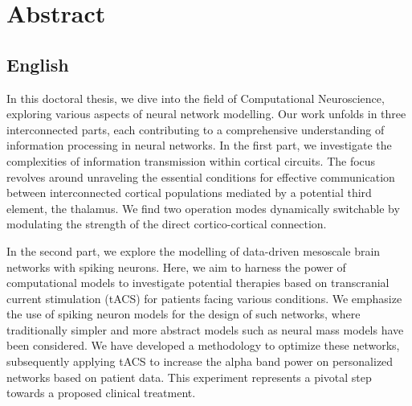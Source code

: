 \documentclass[../main.tex]{subfiles}
\begin{document}
\begingroup
\let\cleardoublepage\relax
\let\cleardoublepage\relax

\chapter*{Abstract}
\section*{English}
In this doctoral thesis, we dive into the field of Computational Neuroscience, exploring various aspects of neural network modelling.
Our work unfolds in three interconnected parts, each contributing to a comprehensive understanding of information processing in neural networks.
In the first part, we investigate the complexities of information transmission within cortical circuits.
The focus revolves around unraveling the essential conditions for effective communication between interconnected cortical populations mediated by a potential third element, the thalamus.
We find two operation modes dynamically switchable by modulating the strength of the direct cortico-cortical connection.

In the second part, we explore the modelling of data-driven mesoscale brain networks with spiking neurons.
Here, we aim to harness the power of computational models to investigate potential therapies based on transcranial current stimulation (tACS) for patients facing various conditions.
We emphasize the use of spiking neuron models for the design of such networks, where traditionally simpler and more abstract models such as neural mass models have been considered.
We have developed a methodology to optimize these networks, subsequently applying tACS to increase the alpha band power on personalized networks based on patient data.
This experiment represents a pivotal step towards a proposed clinical treatment.
\end{document}
